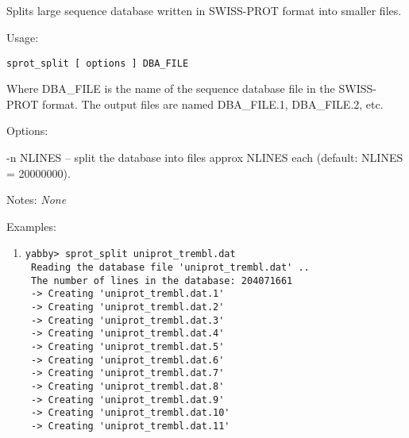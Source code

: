 

\subsection[sprot\_split]{  }



Splits large sequence database written in SWISS-PROT format
into smaller files.


\begin{description}


\item{Usage:}

{\tt sprot\_split [ options ] DBA\_FILE}

 Where DBA\_FILE is the name of the sequence database file in
 the SWISS-PROT format. The output files are named DBA\_FILE.1,
 DBA\_FILE.2, etc.


\item{Options:}
\begin{description}
\item -n NLINES -- split the database into files approx NLINES
 each (default: NLINES = 20000000).
\end{description}


\item{Notes:} {\em None}


\item{Examples:}
\begin{enumerate}

\item
\begin{verbatim}
yabby> sprot_split uniprot_trembl.dat
 Reading the database file 'uniprot_trembl.dat' ..
 The number of lines in the database: 204071661
 -> Creating 'uniprot_trembl.dat.1'
 -> Creating 'uniprot_trembl.dat.2'
 -> Creating 'uniprot_trembl.dat.3'
 -> Creating 'uniprot_trembl.dat.4'
 -> Creating 'uniprot_trembl.dat.5'
 -> Creating 'uniprot_trembl.dat.6'
 -> Creating 'uniprot_trembl.dat.7'
 -> Creating 'uniprot_trembl.dat.8'
 -> Creating 'uniprot_trembl.dat.9'
 -> Creating 'uniprot_trembl.dat.10'
 -> Creating 'uniprot_trembl.dat.11'


\end{verbatim}
\end{enumerate}
\end{description}
